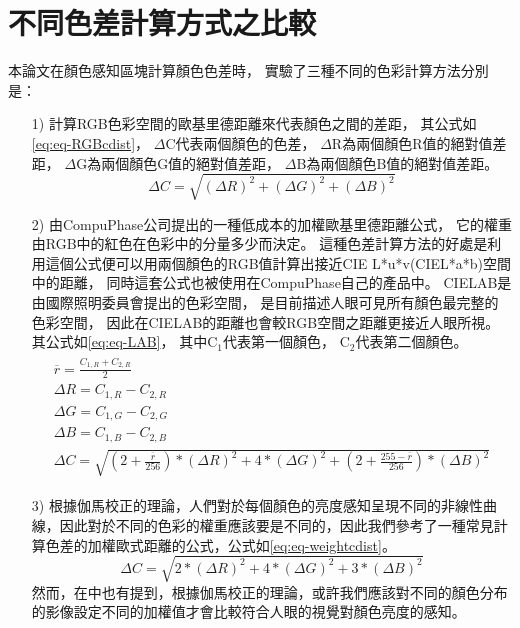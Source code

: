 \documentclass[class=NCU\_thesis, crop=false]{standalone}
\begin{document}
    \section{不同色差計算方式之比較}
    本論文在顏色感知區塊計算顏色色差時，
    實驗了三種不同的色彩計算方法分別是：
    \begin{itemize}
	  \item [1)] 
	  	計算RGB色彩空間的歐基里德距離來代表顏色之間的差距，
	  	其公式如\cref{eq:eq-RGBcdist}，
	  	$\Delta$C代表兩個顏色的色差，
	  	$\Delta$R為兩個顏色R值的絕對值差距，
	  	$\Delta$G為兩個顏色G值的絕對值差距，
	  	$\Delta$B為兩個顏色B值的絕對值差距。
	  	\begin{equation}
	    \label{eq:eq-RGBcdist}
	    	\Delta C = \sqrt{(\Delta R)^2 + (\Delta G)^2 + (\Delta B)^2}
		\end{equation}
	  \item [2)]
	  	由CompuPhase公司提出的一種低成本的加權歐基里德距離公式\cite{LABformula}，
	  	它的權重由RGB中的紅色在色彩中的分量多少而決定。
	  	這種色差計算方法的好處是利用這個公式便可以用兩個顏色的RGB值計算出接近CIE L*u*v(CIEL*a*b)空間中的距離，
	  	同時這套公式也被使用在CompuPhase自己的產品中。
	  	CIELAB是由國際照明委員會提出的色彩空間，
	  	是目前描述人眼可見所有顏色最完整的色彩空間，
	  	因此在CIELAB的距離也會較RGB空間之距離更接近人眼所視。
	  	其公式如\cref{eq:eq-LAB}，
	  	其中C$_{1}$代表第一個顏色，
	  	C$_{2}$代表第二個顏色。
	  	\begin{equation}
	  	\begin{aligned}
	    \label{eq:eq-LAB}
	    \begin{split}
	    	\overline{r} = \frac{C_{1,R} + C_{2,R}}{2} \\
	    	\Delta R = C_{1,R} - C_{2,R} \\
	    	\Delta G = C_{1,G} - C_{2,G} \\
	    	\Delta B = C_{1,B} - C_{2,B} \\
	    	\Delta C = \sqrt{(2 + \frac{\overline{r}}{256}) * (\Delta R)^2 + 4 * (\Delta G)^2 + (2 + \frac{255 - \overline{r}}{256}) * (\Delta B)^2}
	    \end{split}
	    \end{aligned}
		\end{equation}

	  \item [3)]
	  	根據伽馬校正的理論，人們對於每個顏色的亮度感知呈現不同的非線性曲線，因此對於不同的色彩的權重應該要是不同的，因此我們參考了一種常見計算色差的加權歐式距離的公式，公式如\cref{eq:eq-weightcdist}。
	  	\begin{equation}
	    \label{eq:eq-weightcdist}
	    	\Delta C = \sqrt{2 * (\Delta R)^2 + 4 * (\Delta G)^2 + 3 * (\Delta B)^2}
		\end{equation}
		然而，在\cite{LABformula}中也有提到，根據伽馬校正的理論，或許我們應該對不同的顏色分布的影像設定不同的加權值才會比較符合人眼的視覺對顏色亮度的感知。
	\end{itemize}
\end{document}
